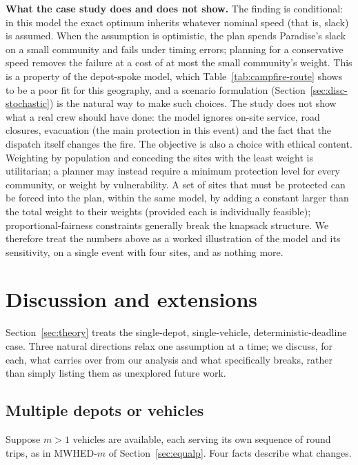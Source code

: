 \documentclass[pdflatex,sn-mathphys-ay]{sn-jnl}
\theoremstyle{thmstyleone}
\theoremstyle{thmstyletwo}
\theoremstyle{thmstylethree}
\begin{document}
\textbf{What the case study does and does not show.} The finding is
conditional: in this model the exact optimum inherits whatever
nominal speed (that is, slack) is assumed. When the assumption is
optimistic, the plan spends Paradise's slack on a small community and
fails under timing errors; planning for a conservative speed removes the
failure at a cost of at most the small community's weight. This is a
property of the depot-spoke model, which Table~\ref{tab:campfire-route}
shows to be a poor fit for this geography, and a scenario formulation
(Section~\ref{sec:disc-stochastic}) is the natural way to make such
choices. The study does not show what a real crew should have done: the
model ignores on-site service, road closures, evacuation (the main
protection in this event) and the fact that the dispatch itself changes
the fire. The objective is also a choice with ethical content. Weighting
by population and conceding the sites with the least weight is
utilitarian; a planner may instead require a minimum protection level for
every community, or weight by vulnerability. A set of sites that must be
protected can be forced into the plan, within the same model, by adding a
constant larger than the total weight to their weights (provided each is
individually feasible); proportional-fairness constraints generally break
the knapsack structure. We therefore treat the numbers above as a worked
illustration of the model and its sensitivity, on a single event with
four sites, and as nothing more.

\section{Discussion and extensions}\label{sec:discussion}

Section~\ref{sec:theory} treats the single-depot, single-vehicle,
deterministic-deadline case. Three natural
directions relax one assumption at a time; we discuss, for each, what
carries over from our analysis and what specifically breaks, rather
than simply listing them as unexplored future work.

\subsection{Multiple depots or vehicles}\label{sec:disc-multi}

Suppose $m>1$ vehicles are available, each serving its own sequence of
round trips, as in MWHED-$m$ of Section~\ref{sec:equalp}. Four facts
describe what changes.
\end{document}
